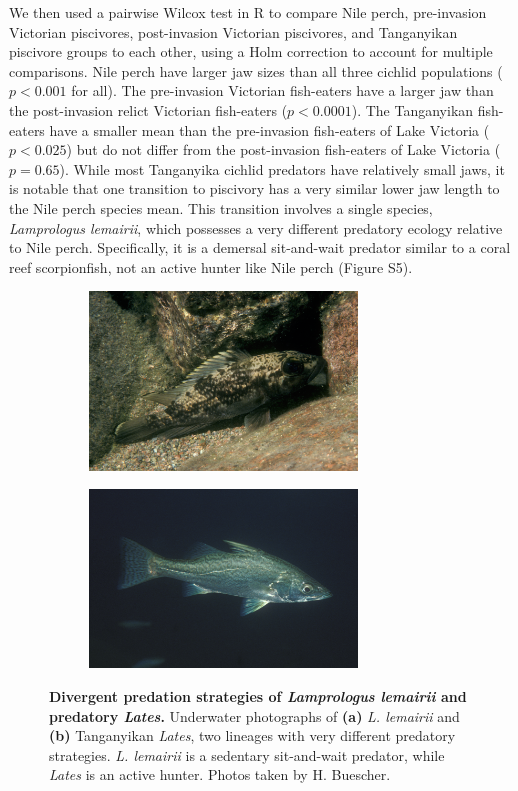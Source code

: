 We then used a pairwise Wilcox test in R to compare Nile perch, pre-invasion Victorian piscivores, post-invasion Victorian piscivores, and Tanganyikan piscivore groups to each other, using a Holm correction to account for multiple comparisons. Nile perch have larger jaw sizes than all three cichlid populations ($p<0.001$ for all). The pre-invasion Victorian fish-eaters have a larger jaw than the post-invasion relict Victorian fish-eaters ($p<0.0001$). The Tanganyikan fish-eaters have a smaller mean than the pre-invasion fish-eaters of Lake Victoria ($p<0.025$) but do not differ from the post-invasion fish-eaters of Lake Victoria ($p=0.65$). While most Tanganyika cichlid predators have relatively small jaws, it is notable that one transition to piscivory has a very similar lower jaw length to the Nile perch species mean. This transition involves a single species, {\em Lamprologus lemairii}, which possesses a very different predatory ecology relative to Nile perch. Specifically, it is a demersal sit-and-wait predator similar to a coral reef scorpionfish, not an active hunter like Nile perch (Figure S5). 

\begin{figure}
    \centering
    \begin{subfigure}[t]{2.8in}
        \includegraphics[width=2.8in]{FishJaws/figures/fig8a}
    \end{subfigure}
    \begin{subfigure}[t]{2.8in}
        \includegraphics[width=2.8in]{FishJaws/figures/fig8b}
    \end{subfigure}
    \caption{\textbf{Divergent predation strategies of {\em Lamprologus lemairii} and predatory {\em Lates}.} Underwater photographs of \textbf{(a)} {\em L. lemairii} and \textbf{(b)} Tanganyikan {\em Lates}, two lineages with very different predatory strategies. {\em L. lemairii} is a sedentary sit-and-wait predator, while {\em Lates} is an active hunter. Photos taken by H. Buescher.}
    \label{FJ_fig8}
\end{figure}









